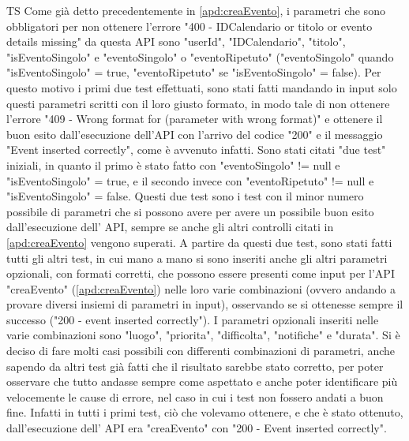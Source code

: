\begin{listaPersonale}{TS}
                Come già detto precedentemente in \ref{apd:creaEvento}, i parametri che sono obbligatori per non ottenere l'errore "400 - IDCalendario or titolo or evento details missing" da questa API sono "userId", "IDCalendario", "titolo", "isEventoSingolo" e "eventoSingolo" o "eventoRipetuto" ("eventoSingolo" quando "isEventoSingolo" = true, "eventoRipetuto" se "isEventoSingolo" = false). Per questo motivo i primi due test effettuati, sono stati fatti mandando in input solo questi parametri scritti con il loro giusto formato, in modo tale di non ottenere l'errore "409 - Wrong format for (parameter with wrong format)" e ottenere il buon esito dall'esecuzione dell'API con l'arrivo del codice "200" e il messaggio "Event inserted correctly", come è avvenuto infatti. Sono stati citati "due test" iniziali, in quanto il primo è stato fatto con "eventoSingolo" != null e "isEventoSingolo" = true, e il secondo invece con "eventoRipetuto" != null e "isEventoSingolo" = false. Questi due test sono i test con il minor numero possibile di parametri che si possono avere per avere un possibile buon esito dall'esecuzione dell' API, sempre se anche gli altri controlli citati in \ref{apd:creaEvento} vengono superati.
                A partire da questi due test, sono stati fatti tutti gli altri test, in cui mano a mano si sono inseriti anche gli altri parametri opzionali, con formati corretti, che possono essere presenti come input per l'API "creaEvento" (\ref{apd:creaEvento}) nelle loro varie combinazioni (ovvero andando a provare diversi insiemi di parametri in input), osservando se si ottenesse sempre il successo ("200 - event inserted correctly"). I parametri opzionali inseriti nelle varie combinazioni sono "luogo", "priorita", "difficolta", "notifiche" e "durata". Si è deciso di fare molti casi possibili con differenti combinazioni di parametri, anche sapendo da altri test già fatti che il risultato sarebbe stato corretto, per poter osservare che tutto andasse sempre come aspettato e anche poter identificare più velocemente le cause di errore, nel caso in cui i test non fossero andati a buon fine. Infatti in tutti i primi test, ciò che volevamo ottenere, e che è stato ottenuto, dall'esecuzione dell' API era "creaEvento" con "200 - Event inserted correctly".
                \begin{center}

\end{center}
\end{listaPersonale}
